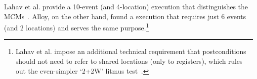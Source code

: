 Lahav et al. provide a 10-event (and 4-location) execution that
distinguishes the MCMs~\cite[Fig.~5]{lahav+16}. Alloy, on the other
hand, found a execution that requires just 6 events (and 2 locations)
and serves the same purpose.\footnote{Lahav et al. impose an additional technical requirement
that postconditions should not need to refer to shared locations (only
to registers), which rules out the even-simpler `2+2W' litmus
test~\cite{sarkar+11}.}
%
